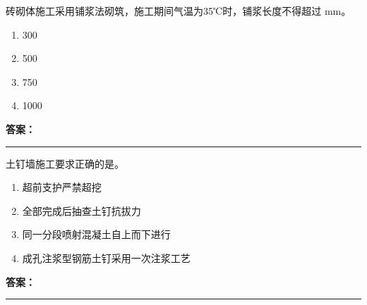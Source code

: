\documentclass[UTF8,fontset=fandol,11pt]{ctexart}
\newcommand{\answerline}{\textcolor{answerred}{\rule{2.4cm}{0.7pt}}}
\begin{document}
\begin{quizbox}[title={乱序第 121 题｜第六章砌筑工程}]

砖砌体施工采用铺浆法砌筑，施工期间气温为35℃时，铺浆长度不得超过 mm。\\

\begin{enumerate}[label=\Alph*.]

\item 300

\item 500

\item 750

\item 1000

\end{enumerate}

\textbf{\textcolor{answerred}{答案：}} \answerline

\end{quizbox}

\vspace{0.2em}

\begin{quizbox}[title={乱序第 122 题｜第三章基坑工程}]

土钉墙施工要求正确的是。\\

\begin{enumerate}[label=\Alph*.]

\item 超前支护严禁超挖

\item 全部完成后抽查土钉抗拔力

\item 同一分段喷射混凝土自上而下进行

\item 成孔注浆型钢筋土钉采用一次注浆工艺

\end{enumerate}

\textbf{\textcolor{answerred}{答案：}} \answerline

\end{quizbox}

\vspace{0.2em}
\end{document}
